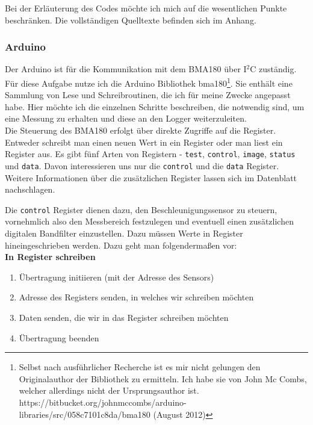 \documentclass[12pt,a4paper]{scrartcl}
\begin{document}
Bei der Erläuterung des Codes möchte ich mich auf die wesentlichen Punkte beschränken. Die vollständigen Quelltexte befinden sich im Anhang.

\subsubsection{Arduino}

Der Arduino ist für die Kommunikation mit dem BMA180 über I$^2$C zuständig. Für diese Aufgabe nutze ich die Arduino Bibliothek bma180\footnote{Selbst nach ausführlicher Recherche ist es mir nicht gelungen den Originalauthor der Bibliothek zu ermitteln. Ich habe sie von John Mc Combs, welcher allerdings nicht der Ursprungsauthor ist. \\ https://bitbucket.org/johnmccombs/arduino-libraries/src/058c7101c8da/bma180 (August 2012)}. Sie enthält eine Sammlung von Lese und Schreibroutinen, die ich für meine Zwecke angepasst habe.
Hier möchte ich die einzelnen Schritte beschreiben, die notwendig sind, um eine Messung zu erhalten und diese an den Logger weiterzuleiten. \\

Die Steuerung des BMA180 erfolgt über direkte Zugriffe auf die Register. Entweder schreibt man einen neuen Wert in ein Register oder man liest ein Register aus. Es gibt fünf Arten von Registern - \texttt{test}, \texttt{control}, \texttt{image}, \texttt{status} und \texttt{data}.
Davon interessieren uns nur die \texttt{control} und die \texttt{data} Register. Weitere Informationen über die zusätzlichen Register lassen sich im Datenblatt \citep{Sensortec:2009rt} nachschlagen.

Die \texttt{control} Register dienen dazu, den Beschleunigungssensor zu steuern, vornehmlich also den Messbereich festzulegen und eventuell einen zusätzlichen digitalen Bandfilter einzustellen. Dazu müssen Werte in Register hineingeschrieben werden. Dazu geht man folgendermaßen vor:\\

\textbf{In Register schreiben}
\begin{enumerate}
	\item Übertragung initiieren (mit der Adresse des Sensors)
	\item Adresse des Registers senden, in welches wir schreiben möchten
	\item Daten senden, die wir in das Register schreiben möchten
	\item Übertragung beenden
\end{enumerate}
\end{document}
